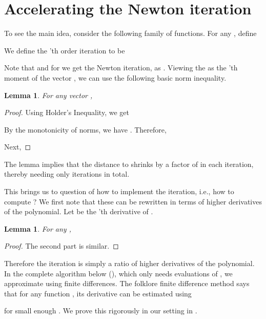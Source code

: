 \documentclass{article}[12pt]
\newtheorem{lemma}[theorem]{Lemma}
\theoremstyle{definition}
\newenvironment{mybox}
{\center \noindent\begin{boxedminipage}{1.0\linewidth}}
{\end{boxedminipage}
\noindent
}
\begin{document}
\section{Accelerating the Newton iteration}
\label{sec:algo}

To see the main idea, consider the following family of functions.
For any , define 

We define the 'th order iteration to be 
\begin{mybox}

\end{mybox}

Note that  and for  we get the Newton iteration, as .
Viewing the  as the 'th moment of the vector 
, we can use the following basic norm inequality.

\begin{lemma}
\label{lem:knorm}
For any vector ,

\end{lemma}
\begin{proof}
Using Holder's Inequality, we get 

By the monotonicity of norms, we have
. 
Therefore,

Next,

\end{proof}

The lemma implies that the distance to  shrinks by a factor of  in 
each iteration, thereby needing only  iterations in total. 

This brings us to question of how to implement the iteration, i.e., how to 
compute ? We first note that these can be rewritten in terms of higher
 derivatives of the polynomial. Let  be the 'th derivative of .
\begin{lemma}
\label{lem:momprime}
For any ,

 
\end{lemma}

\begin{proof}

The second part is similar.
\end{proof}

Therefore the iteration  is simply a ratio of higher derivatives of the polynomial. 
In the complete algorithm below (), which only needs evaluations of , 
we approximate  using finite differences. The folklore finite difference method says that for any
function , its  derivative can be estimated using  

for small enough .
We prove this rigorously in our setting in .
\end{document}
